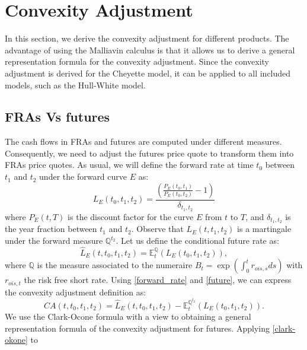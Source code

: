 \documentclass[a4paper,10pt]{article}
\newcommand{\1}{\mathbf{1}}
\begin{document}
 

\section{Convexity Adjustment}\label{sec:CA}
In this section, we derive the convexity adjustment for different products. The advantage of using the Malliavin calculus is that it allows us to derive a general representation formula for the convexity adjustment. Since the convexity adjustment is derived for the Cheyette model, it can be applied to all included models, such as the Hull-White model.

\subsection{FRAs Vs futures}
The cash flows in FRAs and futures are computed under different measures. Consequently, we need to adjust the futures price quote to transform them into FRAs price quotes. As usual, we will define the forward rate at time $t_0$ between $t_1$ and $t_2$ under the forward curve $E$ as:
\begin{equation}\label{forward_rate}
L_{E}(t_0, t_1, t_2) = \frac{\left(\frac{P_{E}(t_0,t_1)}{P_{E}(t_0,t_2)} - 1 \right)}{\delta_{t_1,t_2}}
\end{equation} 
where $P_{E}(t,T)$ is the discount factor for the curve $E$ from $t$ to $T$, and $\delta_{t_1,t_2}$ is the year fraction between $t_1$ and $t_2$. Observe that $L_{E}(t, t_1, t_2)$ is a martingale under the forward measure $\mathbb{Q}^{t_2}$. Let us define the conditional future rate as:  
\begin{equation}\label{future}
\hat{L}_{E}(t,t_0, t_1, t_2) = \mathbb{E}_t^{\mathbb{Q}}\left(L_{E}(t_0, t_1, t_2) \right), 
\end{equation}
where $\mathbb{Q}$ is the measure associated to the numeraire $B_t=\exp\left(\int_{0}^{t} r_{ois, s} ds \right)$ with $ r_{ois, t}$ the risk free short rate. Using
\eqref{forward_rate} and \eqref{future}, we can express the convexity adjustment definition as:%
\begin{equation*}
CA(t, t_0, t_1, t_2) = \hat{L}_{E}(t,t_0, t_1, t_2) - \mathbb{E}_t^{\mathbb{Q}^{t_2}}\left(L_{E}(t_0, t_1, t_2) \right).
\end{equation*}
We use the Clark-Ocone formula with a view to obtaining a general representation formula of the convexity adjustment for futures. Applying \eqref{clark-okone} to 
\end{document}
